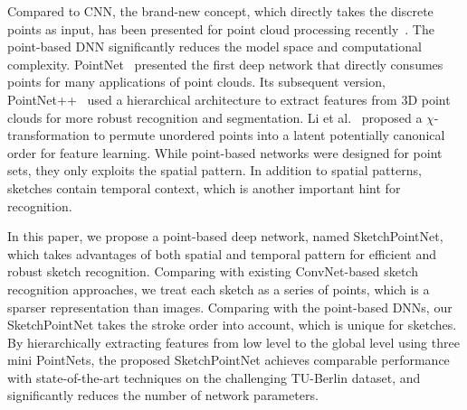  Compared to CNN, the brand-new concept, which directly takes the discrete points as input, has been presented for point cloud processing recently~\cite{qi2017pointnet, qi2017pointnetplusplus, 1801.07791}.
The point-based DNN significantly reduces the model space and computational complexity.
%
PointNet~\cite{qi2017pointnet} presented the first deep network that directly consumes points for many applications of point clouds.
Its subsequent version, PointNet++~\cite{qi2017pointnetplusplus} used a hierarchical architecture to extract features from 3D point clouds for more robust recognition and segmentation.
%
Li et al.~\cite{1801.07791} proposed a $\chi$-transformation to permute unordered points into a latent potentially canonical order for feature learning.
While point-based networks were designed for point sets, they only exploits the spatial pattern. 
In addition to spatial patterns, sketches contain temporal context, which is another important hint for recognition. 



In this paper, we propose a point-based deep network, named SketchPointNet, which takes advantages of both spatial and temporal pattern for efficient and robust sketch recognition.
%
Comparing with existing ConvNet-based sketch recognition approaches, we treat each sketch as a series of points, which is a sparser representation than images. 
Comparing with the point-based DNNs, our SketchPointNet takes the stroke order into account, which is unique for sketches.
%
By hierarchically extracting features from low level to the global level using three mini PointNets, the proposed SketchPointNet achieves comparable performance with state-of-the-art techniques on the challenging TU-Berlin dataset, and significantly reduces the number of network parameters.
 
